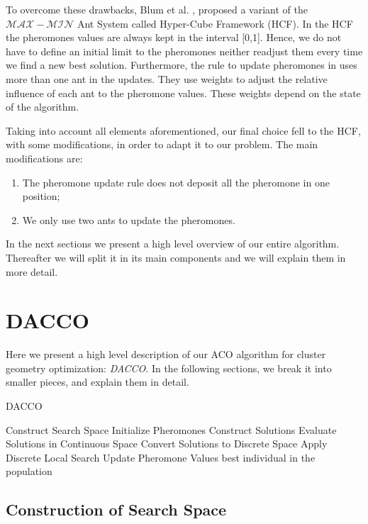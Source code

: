 To overcome these drawbacks, Blum et al. \cite{blum04}, proposed a variant of the $\mathcal{MAX}-\mathcal{MIN}$ Ant System called Hyper-Cube Framework (HCF). In the HCF the pheromones values are always kept in the interval [0,1]. Hence, we do not have to define an initial limit to the pheromones neither readjust them every time we find a new best solution. Furthermore, the rule to update pheromones in \cite{blum04} uses more than one ant in the updates. They use weights to adjust the relative influence of each ant to the pheromone values. These weights depend on the state of the algorithm.

Taking into account all elements aforementioned, our final choice fell to the HCF, with some modifications, in order to adapt it to our problem. The main modifications are:
\begin{enumerate}
	\item The pheromone update rule does not deposit all the pheromone in one position;
	\item We only use two ants to update the pheromones.
\end{enumerate}

In the next sections we present a high level overview of our entire algorithm. Thereafter we will split it in its main components and we will explain them in more detail.

	
	\pagebreak
	\section{DACCO}
	Here we present a high level description of our ACO algorithm for cluster geometry optimization: \emph{DACCO}. In the following sections, we break it into smaller pieces, and explain them in detail.
	
	\begin{algorithm}
		\caption{DACCO}
		\label{alg:dacco}
		\begin{algorithmic}
		\STATE Construct Search Space
		\STATE Initialize Pheromones
			\STATE Construct Solutions
			\STATE Evaluate Solutions in Continuous Space
			\STATE Convert Solutions to Discrete Space
			\STATE Apply Discrete Local Search
			\STATE Update Pheromone Values
		\ENDWHILE
		\RETURN best individual in the population
		\end{algorithmic}
	\end{algorithm}
	
	\subsection{Construction of Search Space}
	
